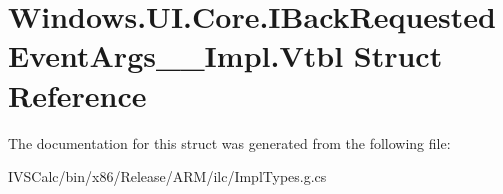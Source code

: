 \hypertarget{struct_windows_1_1_u_i_1_1_core_1_1_i_back_requested_event_args_____impl_1_1_vtbl}{}\section{Windows.\+U\+I.\+Core.\+I\+Back\+Requested\+Event\+Args\+\_\+\+\_\+\+Impl.\+Vtbl Struct Reference}
\label{struct_windows_1_1_u_i_1_1_core_1_1_i_back_requested_event_args_____impl_1_1_vtbl}


The documentation for this struct was generated from the following file\+:\begin{DoxyCompactItemize}
\item 
I\+V\+S\+Calc/bin/x86/\+Release/\+A\+R\+M/ilc/Impl\+Types.\+g.\+cs\end{DoxyCompactItemize}
